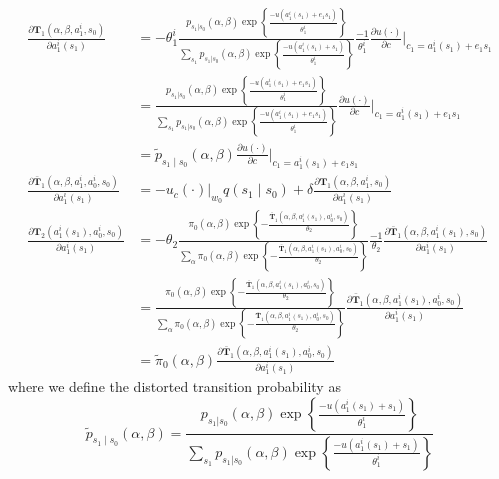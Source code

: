 \documentclass[a4paper,12pt]{article}
\begin{document}
\begin{align}
\frac{\partial \mathbf{T}_1(\alpha, \beta, a_1^i, s_0)}{\partial a_1^i(s_1)} &= -\theta_1^i \frac{p_{s_1|s_0}(\alpha,\beta) \exp\left\{{\frac{-u(a_1^i(s_1) + e_1 s_1)}{\theta_1^i}}\right\}}{\sum_{s_1}{p_{s_1|s_0}(\alpha,\beta) \exp\left\{{\frac{-u(a_1^i(s_1) + s_1)}{\theta_1^i}}\right\}}} \frac{-1}{\theta_1^i} \frac{\partial u(\cdot)}{\partial c}\Big |_{c_1=a_1^i(s_1) + e_1 s_1}  \nonumber\\
&=\frac{p_{s_1|s_0}(\alpha,\beta) \exp\left\{{\frac{-u(a_1^i(s_1) + e_1 s_1)}{\theta_1^i}}\right\}}{\sum_{s_1}{p_{s_1|s_0}(\alpha,\beta) \exp\left\{{\frac{-u(a_1^i(s_1) + e_1 s_1)}{\theta_1^i}}\right\}}}\frac{\partial u(\cdot)}{\partial c}\Big |_{c_1=a_1^i(s_1) + e_1 s_1} \nonumber\\
&=\tilde{p}_{s_1 \mid s_0}(\alpha,\beta) \frac{\partial u(\cdot)}{\partial c}\Big |_{c_1=a_1^i(s_1) + e_1 s_1} \label{eq:T1}\\
\frac{\partial \bar{\mathbf{T}}_1(\alpha,\beta,a_1^i,a_0^i,s_0)}{\partial a_1^i(s_1)} &= -u_c(\cdot)\vert_{w_0} q(s_1\mid s_0) + \delta \frac{\partial \mathbf{T}_1(\alpha,\beta,a_1^i,s_0)}{\partial a_1^i(s_1)} \label{eq:T11} \\
\frac{\partial \mathbf{T}_2(a_1^i(s_1),a_0^i,s_0)}{\partial a_1^i(s_1)}    &= -\theta_2 \frac{\pi_0(\alpha,\beta)\exp\left \{ - \frac{\bar{\mathbf{T}}_1(\alpha,\beta, a_1^i(s_1),a_0^i,s_0)}{\theta_2} \right\}}{\sum_{\alpha}{\pi_0(\alpha,\beta)\exp\left \{ -\frac{\bar{\mathbf{T}}_1(\alpha,\beta,a_1^i(s_1),a_0^i,s_0)}{\theta_2} \right\}}} \frac{-1}{\theta_2} \frac{\partial \bar{\mathbf{T}}_1(\alpha,\beta,a_1^i(s_1),s_0)}{\partial a_1^i(s_1)} \nonumber\\
&=\frac{\pi_0(\alpha,\beta)\exp\left \{ - \frac{\bar{\mathbf{T}}_1(\alpha, \beta, a_1^i(s_1),a_0^i,s_0)}{\theta_2} \right\}}{\sum_{\alpha}{\pi_0(\alpha,\beta)\exp\left \{ -\frac{\bar{\mathbf{T}}_1(\alpha, \beta, a_1^i(s_1),a_0^i,s_0)}{\theta_2} \right\}}} \frac{\partial \bar{\mathbf{T}}_1(\alpha,\beta,a_1^i(s_1),a_0^i,s_0)}{\partial a_1^i(s_1)} \nonumber \\
&= \tilde{\pi}_0(\alpha,\beta) \frac{\partial \bar{\mathbf{T}}_1(\alpha,\beta,a_1^i(s_1),a_0^i,s_0)}{\partial a_1^i(s_1)} \label{eq:T2}
\end{align}
where we define the distorted transition probability as
\[
\tilde{p}_{s_1 \mid s_0}(\alpha,\beta) = \frac{p_{s_1|s_0}(\alpha,\beta) \exp\left\{{\frac{-u(a_1^i(s_1) + s_1)}{\theta_1^i}}\right\}}{\sum_{s_1}{p_{s_1|s_0}(\alpha,\beta) \exp\left\{{\frac{-u(a_1^i(s_1) + s_1)}{\theta_1^i}}\right\}}}
\]
\end{document}

